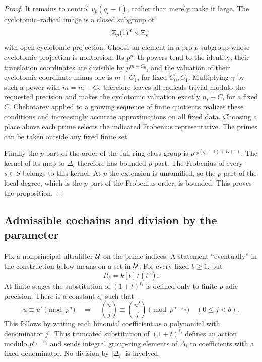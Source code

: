 \begin{proof}
It remains to control $v_p(q_i-1)$, rather than merely make it
large.  The cyclotomic--radical image is a closed subgroup of
\[
 \mathbb Z_p(1)^d\rtimes\mathbb Z_p^\times
\]
with open cyclotomic projection.  Choose an element in a pro-$p$
subgroup whose cyclotomic projection is nontorsion.  Its $p^m$-th
powers tend to the identity; their translation coordinates are
divisible by $p^{m-C_0}$, and the valuation of their cyclotomic
coordinate minus one is $m+C_1$, for fixed $C_0,C_1$.  Multiplying
$\gamma$ by such a power with $m=n_i+C_2$ therefore leaves all
radicals trivial modulo the requested precision and makes the
cyclotomic valuation exactly $n_i+C$, for a fixed $C$.  Chebotarev
applied to a growing sequence of finite quotients realizes these
conditions and increasingly accurate approximations on all fixed
data.  Choosing a place above each prime selects the indicated
Frobenius representative.  The primes can be taken outside any
fixed finite set.

Finally the $p$-part of the order of the full ring class group is
$p^{v_p(q_i-1)+O(1)}$.  The kernel of its map to $\Delta_i$ therefore
has bounded $p$-part.  The Frobenius of every $s\in S$ belongs to this
kernel.  At $p$ the extension is unramified, so the $p$-part of the
local degree, which is the $p$-part of the Frobenius order, is
bounded.  This proves the proposition.
\end{proof}

\subsection{Admissible cochains and division by the parameter}

Fix a nonprincipal ultrafilter $\mathcal U$ on the prime indices.  A
statement ``eventually'' in the construction below means on a set
in $\mathcal U$.  For every fixed $b\ge1$, put
\[
 R_b=k[t]/(t^b).
\]
At finite stages the substitution of $(1+t)^{\ell_i}$ is defined
only to finite $p$-adic precision.  There is a constant $c_b$ such that
\begin{equation}\label{eq:binomial-loss}
 u\equiv u'\pmod {p^n}\quad\Longrightarrow\quad
 \binom{u}{j}\equiv\binom{u'}{j}\pmod {p^{n-c_b}}
 \quad(0\le j<b).
\end{equation}
This follows by writing each binomial coefficient as a polynomial
with denominator $j!$.  Thus truncated substitution of
$(1+t)^{\ell_i}$ defines an action modulo $p^{n_i-c_b}$ and sends
integral group-ring elements of $\Delta_i$ to coefficients with a
fixed denominator.  No division by $|\Delta_i|$ is involved.

